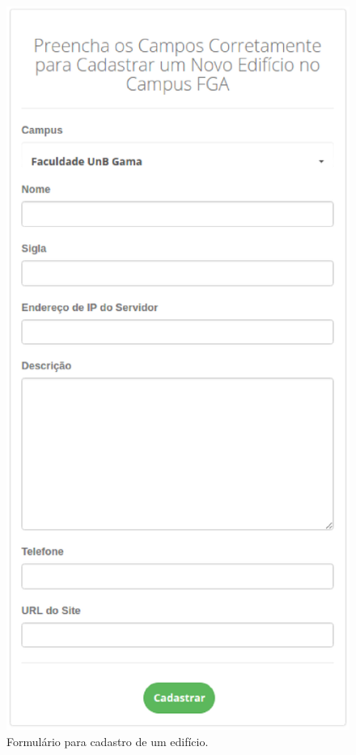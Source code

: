 \begin{anexosenv}
\begin{figure}[!htpb]
    \centering
    \includegraphics[keepaspectratio=true,scale=0.65]{figuras/img10.eps}
    \caption{Formulário para cadastro de um edifício.}
    \label{img10}
\end{figure}


\end{anexosenv}
